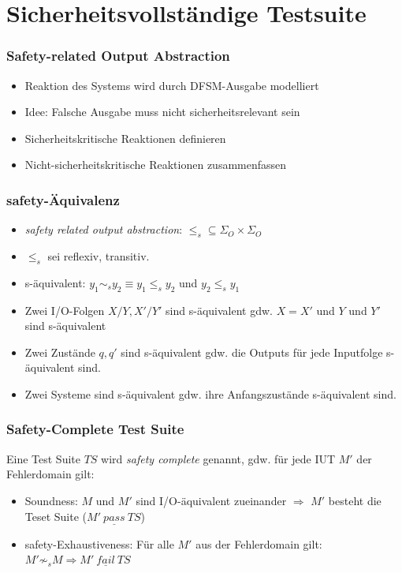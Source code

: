 \section{Sicherheitsvollständige Testsuite}
\begin{frame}
\frametitle{Safety-related Output Abstraction}
\begin{itemize}
  \item<1-> Reaktion des Systems wird durch DFSM-Ausgabe modelliert
  \item<2-> Idee: Falsche Ausgabe muss nicht sicherheitsrelevant sein
  \item<3-> Sicherheitskritische Reaktionen definieren
  \item<4-> Nicht-sicherheitskritische Reaktionen zusammenfassen
\end{itemize}
\end{frame}

\begin{frame}
\frametitle{safety-Äquivalenz}
\begin{itemize}
  \item<1-> \emph{safety related output abstraction}: $\leq_s \subseteq \Sigma_O \times \Sigma_O$
  \item<2-> $\leq_s$ sei reflexiv, transitiv.
  \item<3-> s-äquivalent: $y_1 \sim_s y_2 \equiv y_1 \leq_s y_2$ und $y_2 \leq_s y_1$
  \item<4-> Zwei I/O-Folgen $X/Y, X'/Y'$ sind s-äquivalent gdw. $X=X'$ und $Y$ und $Y'$ sind s-äquivalent
  \item<5-> Zwei Zustände $q, q'$ sind s-äquivalent gdw. die Outputs für jede Inputfolge s-äquivalent sind.
  \item<6-> Zwei Systeme sind s-äquivalent gdw. ihre Anfangszustände s-äquivalent sind.
\end{itemize}
\end{frame}

\begin{frame}
\frametitle{Safety-Complete Test Suite}
Eine Test Suite $TS$ wird \emph{safety complete} genannt, gdw. für jede IUT $M'$ der Fehlerdomain gilt:
\begin{itemize}
  \item<1-> Soundness: $M$ und $M'$ sind I/O-äquivalent zueinander $\Rightarrow$ $M'$ besteht die Teset Suite ($M'~ \underline{pass}~ TS$)
  \item<2-> safety-Exhaustiveness: Für alle $M'$ aus der Fehlerdomain gilt: $M' \not \sim_s M \Rightarrow M'~ \underline{fail}~ TS$
\end{itemize}
\end{frame}

